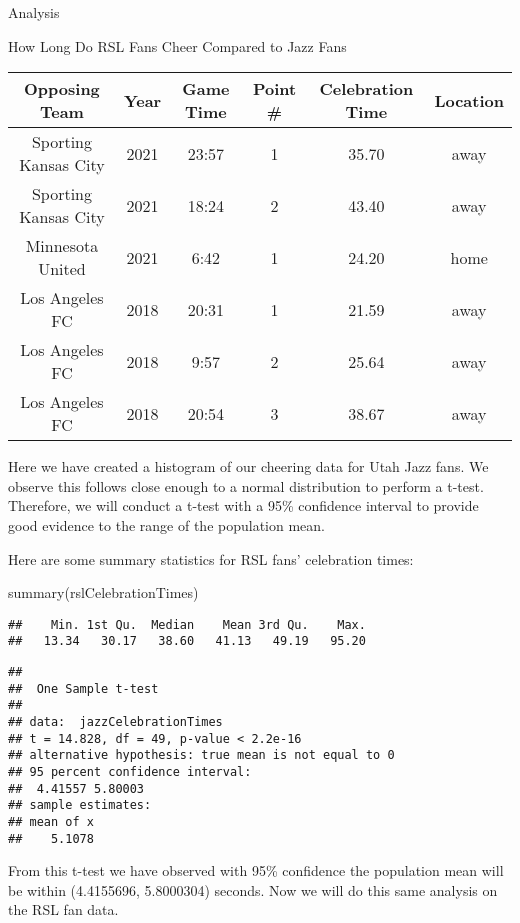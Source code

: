 \documentclass[
  ignorenonframetext,
]{beamer}
\newenvironment{Shaded}{\begin{snugshade}}{\end{snugshade}}
\newcommand{\FunctionTok}[1]{\textcolor[rgb]{0.00,0.00,0.00}{#1}}
\newcommand{\NormalTok}[1]{#1}
\begin{document}
\begin{frame}[fragile]{Analysis}
\begin{block}{How Long Do RSL Fans Cheer Compared to Jazz Fans}
\begin{table}
\centering
\begin{tabular}{c|c|c|c|c|c}
\hline
Opposing Team & Year & Game Time & Point \# & Celebration Time & Location\\
\hline
Sporting Kansas City & 2021 & 23:57 & 1 & 35.70 & away\\
\hline
Sporting Kansas City & 2021 & 18:24 & 2 & 43.40 & away\\
\hline
Minnesota United & 2021 & 6:42 & 1 & 24.20 & home\\
\hline
Los Angeles FC & 2018 & 20:31 & 1 & 21.59 & away\\
\hline
Los Angeles FC & 2018 & 9:57 & 2 & 25.64 & away\\
\hline
Los Angeles FC & 2018 & 20:54 & 3 & 38.67 & away\\
\hline
\end{tabular}
\end{table}

Here we have created a histogram of our cheering data for Utah Jazz
fans. We observe this follows close enough to a normal distribution to
perform a t-test. Therefore, we will conduct a t-test with a 95\%
confidence interval to provide good evidence to the range of the
population mean.

Here are some summary statistics for RSL fans' celebration times:

\begin{Shaded}
\begin{Highlighting}[]
\FunctionTok{summary}\NormalTok{(rslCelebrationTimes)}
\end{Highlighting}
\end{Shaded}

\begin{verbatim}
##    Min. 1st Qu.  Median    Mean 3rd Qu.    Max. 
##   13.34   30.17   38.60   41.13   49.19   95.20
\end{verbatim}

\begin{verbatim}
## 
##  One Sample t-test
## 
## data:  jazzCelebrationTimes
## t = 14.828, df = 49, p-value < 2.2e-16
## alternative hypothesis: true mean is not equal to 0
## 95 percent confidence interval:
##  4.41557 5.80003
## sample estimates:
## mean of x 
##    5.1078
\end{verbatim}

From this t-test we have observed with 95\% confidence the population
mean will be within (4.4155696, 5.8000304) seconds. Now we will do this
same analysis on the RSL fan data.


\end{block}
\end{frame}
\end{document}
